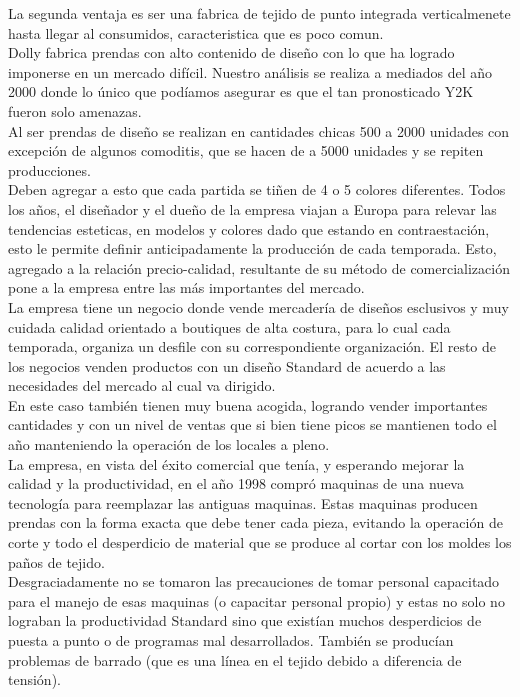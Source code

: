 \documentclass[a4paper,10pt,titlepage]{article}
\begin{document}
		\indent La segunda ventaja es ser una fabrica de tejido de punto integrada verticalmenete hasta llegar al consumidos, caracteristica que es poco comun.\\
		\indent Dolly fabrica prendas con alto contenido de diseño con lo que ha logrado imponerse en un mercado dif\'icil. Nuestro an\'alisis se realiza a mediados del año 2000 donde lo \'unico que pod\'iamos asegurar es que el tan pronosticado Y2K fueron solo amenazas.\\
		\indent Al ser prendas de diseño se realizan en cantidades chicas 500 a 2000 unidades con excepci\'on de algunos comoditis, que se hacen de a 5000 unidades y se repiten producciones.\\ 
		\indent Deben agregar a esto que cada partida se tiñen de 4 o 5 colores diferentes. Todos los años, el diseñador y el dueño de la empresa viajan a Europa para relevar las tendencias esteticas, en modelos y colores dado que estando en contraestaci\'on, esto le permite definir anticipadamente la producci\'on de cada temporada. Esto, agregado a la relaci\'on precio-calidad, resultante de su m\'etodo de comercializaci\'on pone a la empresa entre las m\'as importantes del mercado.\\
		\indent La empresa tiene un negocio donde vende mercader\'ia de diseños esclusivos y muy cuidada calidad orientado a boutiques de alta costura, para lo cual cada temporada, organiza un desfile con su correspondiente organizaci\'on. El resto de los negocios venden productos con un diseño Standard de acuerdo a las necesidades del mercado al cual va dirigido.\\
		\indent En este caso tambi\'en tienen muy buena acogida, logrando vender importantes cantidades y con un nivel de ventas que si bien tiene picos se mantienen todo el año manteniendo la operaci\'on de los locales a pleno.\\
		\indent La empresa, en vista del \'exito comercial que ten\'ia, y esperando mejorar la calidad y la productividad, en el año 1998 compr\'o maquinas de una nueva tecnolog\'ia para reemplazar las antiguas maquinas. Estas maquinas producen prendas con la forma exacta que debe tener cada pieza, evitando la operaci\'on de corte y todo el desperdicio de material que se produce al cortar con los moldes los paños de tejido.\\
		\indent Desgraciadamente no se tomaron las precauciones de tomar personal capacitado para el manejo de esas maquinas (o capacitar personal propio) y estas no solo no lograban la productividad Standard sino que exist\'ian muchos desperdicios de puesta a punto o de programas mal desarrollados. Tambi\'en se produc\'ian problemas de barrado (que es una l\'inea en el tejido debido a diferencia de tensi\'on).\\
\end{document}
